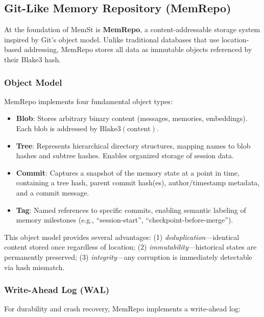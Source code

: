 \subsection{Git-Like Memory Repository (MemRepo)}

At the foundation of MemSt is \textbf{MemRepo}, a content-addressable storage system inspired by Git's object model. Unlike traditional databases that use location-based addressing, MemRepo stores all data as immutable objects referenced by their Blake3 hash.

\subsubsection{Object Model}

MemRepo implements four fundamental object types:

\begin{itemize}
    \item \textbf{Blob}: Stores arbitrary binary content (messages, memories, embeddings). Each blob is addressed by $\text{Blake3}(\text{content})$.
    
    \item \textbf{Tree}: Represents hierarchical directory structures, mapping names to blob hashes and subtree hashes. Enables organized storage of session data.
    
    \item \textbf{Commit}: Captures a snapshot of the memory state at a point in time, containing a tree hash, parent commit hash(es), author/timestamp metadata, and a commit message.
    
    \item \textbf{Tag}: Named references to specific commits, enabling semantic labeling of memory milestones (e.g., ``session-start'', ``checkpoint-before-merge'').
\end{itemize}

This object model provides several advantages: (1) \textit{deduplication}---identical content stored once regardless of location; (2) \textit{immutability}---historical states are permanently preserved; (3) \textit{integrity}---any corruption is immediately detectable via hash mismatch.

\subsubsection{Write-Ahead Log (WAL)}

For durability and crash recovery, MemRepo implements a write-ahead log:

